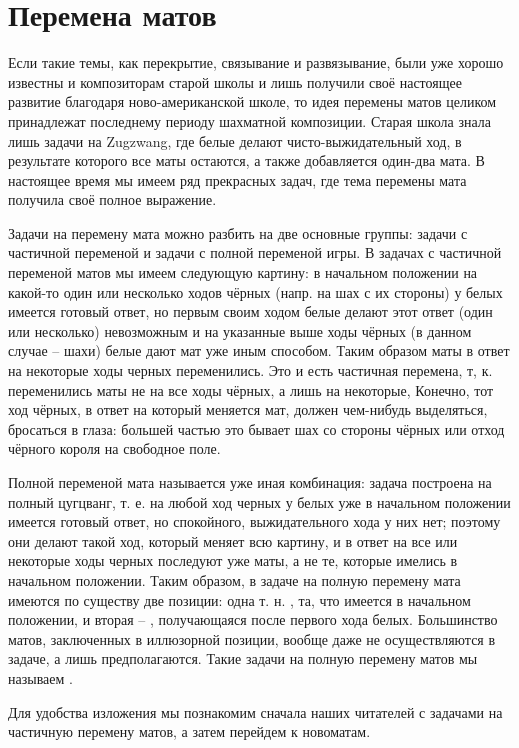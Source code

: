 \chapter{Перемена матов}

Если такие темы, как перекрытие, связывание и развязывание, были уже хорошо известны и композиторам старой школы и лишь получили своё настоящее развитие благодаря ново-американской школе, то идея перемены матов целиком принадлежат последнему периоду шахматной композиции. Старая школа знала лишь задачи на Zugzwang, где белые делают чисто-выжидательный ход, в результате которого все маты остаются, а также добавляется один-два мата. В настоящее время мы имеем ряд прекрасных задач, где тема перемены мата получила своё полное выражение.

Задачи на перемену мата можно разбить на две основные группы: задачи с частичной переменой и задачи с полной переменой игры. В задачах с частичной переменой матов мы имеем следующую картину: в начальном положении на какой-то один или несколько ходов чёрных (напр. на шах с их стороны) у белых имеется готовый ответ, но первым своим ходом белые делают этот ответ (один или несколько) невозможным и на указанные выше ходы чёрных (в данном случае -- шахи) белые дают мат уже иным способом. Таким образом маты в ответ на некоторые ходы черных переменились. Это и есть частичная перемена, т, к. переменились маты не на все ходы чёрных, а лишь на некоторые, Конечно, тот ход чёрных, в ответ на который меняется мат, должен чем-нибудь выделяться, бросаться в глаза: большей частью это бывает шах со стороны чёрных или отход чёрного короля на свободное поле.

Полной переменой мата называется уже иная комбинация: задача построена на полный цугцванг, т. е. на любой ход черных у белых уже в начальном положении имеется готовый ответ, но спокойного, выжидательного хода у них нет; поэтому они делают такой ход, который меняет всю картину, и в ответ на все или некоторые ходы черных последуют уже  маты, а не те, которые имелись в начальном положении. Таким образом, в задаче на полную перемену мата имеются по существу две позиции: одна т. н. , та, что имеется в начальном положении, и вторая -- , получающаяся после первого хода белых. Большинство матов, заключенных в иллюзорной позиции, вообще даже не осуществляются в задаче, а лишь предполагаются. Такие задачи на полную перемену матов мы называем .

Для удобства изложения мы познакомим сначала наших читателей с задачами на частичную перемену матов, а затем перейдем к новоматам.

